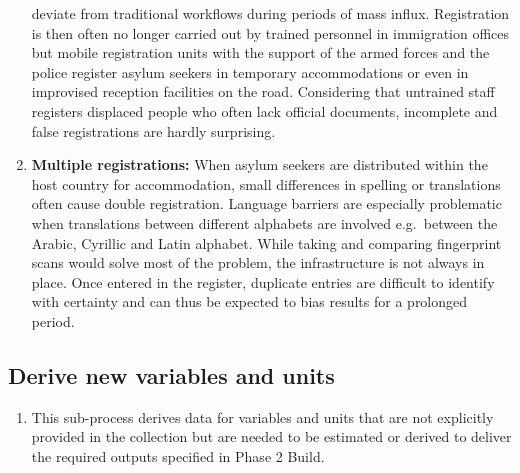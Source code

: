 \documentclass[
]{article}
\providecommand{\tightlist}{%
  \setlength{\itemsep}{0pt}\setlength{\parskip}{0pt}}
\begin{document}
\begin{enumerate}
  deviate from traditional workflows during periods of mass influx.
  Registration is then often no longer carried out by trained
  personnel in immigration offices but mobile registration units with
  the support of the armed forces and the police register asylum
  seekers in temporary accommodations or even in improvised reception
  facilities on the road. Considering that untrained staff registers
  displaced people who often lack official documents, incomplete and
  false registrations are hardly surprising.
\item
  \textbf{Multiple registrations:} When asylum seekers are distributed
  within the host country for accommodation, small differences in
  spelling or translations often cause double registration. Language
  barriers are especially problematic when translations between
  different alphabets are involved e.g.~between the Arabic, Cyrillic
  and Latin alphabet. While taking and comparing fingerprint scans
  would solve most of the problem, the infrastructure is not always in
  place. Once entered in the register, duplicate entries are difficult
  to identify with certainty and can thus be expected to bias results
  for a prolonged period.
\end{enumerate}

\hypertarget{derive-new-variables-and-units}{%
\subsection{Derive new variables and units}\label{derive-new-variables-and-units}}

\begin{enumerate}
\def\labelenumi{\arabic{enumi}.}
\setcounter{enumi}{388}
\tightlist
\item
  This sub-process derives data for variables and units that are not
  explicitly provided in the collection but are needed to be estimated
  or derived to deliver the required outputs specified in Phase 2
  Build.
\end{enumerate}
\end{document}
